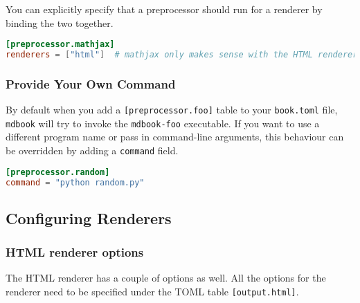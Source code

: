 \documentclass{article}
\begin{document}
You can explicitly specify that a preprocessor should run for a renderer by
binding the two together.\\
\begin{lstlisting}[language=toml]
[preprocessor.mathjax]
renderers = ["html"]  # mathjax only makes sense with the HTML renderer

\end{lstlisting}

\subsubsection{Provide Your Own Command}
\label{Provide Your Own Command}
\label{provide-your-own-command}

By default when you add a \lstinline|[preprocessor.foo]| table to your \lstinline|book.toml| file,
\lstinline|mdbook| will try to invoke the \lstinline|mdbook-foo| executable. If you want to use a
different program name or pass in command-line arguments, this behaviour can
be overridden by adding a \lstinline|command| field.\\
\begin{lstlisting}[language=toml]
[preprocessor.random]
command = "python random.py"

\end{lstlisting}

\subsection{Configuring Renderers}
\label{Configuring Renderers}
\label{configuring-renderers}

\subsubsection{HTML renderer options}
\label{HTML renderer options}
\label{html-renderer-options}

The HTML renderer has a couple of options as well. All the options for the
renderer need to be specified under the TOML table \lstinline|[output.html]|.\\
\end{document}

